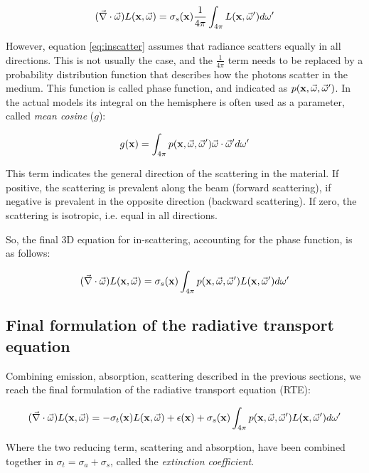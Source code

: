 \begin{equation}
(\vec{\nabla} \cdot \vec{\omega}) L(\mathbf{x}, \vec{\omega}) = \sigma_s(\mathbf{x}) \frac{1}{4 \pi} \int_{4\pi} L(\mathbf{x},\vec{\omega}') d\omega'	
\label{eq:inscatter}
\end{equation}


However, equation \ref{eq:inscatter} assumes that radiance scatters equally in all directions. This is not usually the case, and the $\frac{1}{4 \pi}$ term needs to be replaced by a probability distribution function that describes how the photons scatter in the medium. This function is called phase function, and indicated as $p(\mathbf{x}, \vec{\omega}, \vec{\omega}')$. In the actual models its integral on the hemisphere is often used as a parameter, called \emph{mean cosine} ($g$):

$$
g(\mathbf{x}) = \int_{4 \pi} p(\mathbf{x}, \vec{\omega}, \vec{\omega}') \vec{\omega} \cdot \vec{\omega}' d \omega'
$$

This term indicates the general direction of the scattering in the material. If positive, the scattering is prevalent along the beam (forward scattering), if negative is prevalent in the opposite direction (backward scattering). If zero, the scattering is isotropic, i.e. equal in all directions.

So, the final 3D equation for in-scattering, accounting for the phase function, is as follows:

\begin{equation*}
(\vec{\nabla} \cdot \vec{\omega}) L(\mathbf{x}, \vec{\omega}) = \sigma_s(\mathbf{x}) \int_{4\pi} p(\mathbf{x}, \vec{\omega}, \vec{\omega}') L(\mathbf{x},\vec{\omega}') d\omega'	
\end{equation*}

\subsection{Final formulation of the radiative transport equation}
Combining emission, absorption, scattering described in the previous sections, we reach the final formulation of the radiative transport equation (RTE):

\begin{equation}
(\vec{\nabla} \cdot \vec{\omega}) L(\mathbf{x}, \vec{\omega}) =   -\sigma_t(\mathbf{x}) L(\mathbf{x}, \vec{\omega}) + \epsilon(\mathbf{x}) + \sigma_s(\mathbf{x}) \int_{4\pi} p(\mathbf{x}, \vec{\omega}, \vec{\omega}') L(\mathbf{x},\vec{\omega}') d\omega'
\label{eq:rte}
\end{equation}

Where the two reducing term, scattering and absorption, have been combined together in $\sigma_t = \sigma_a + \sigma_s$, called the \emph{extinction coefficient}.


